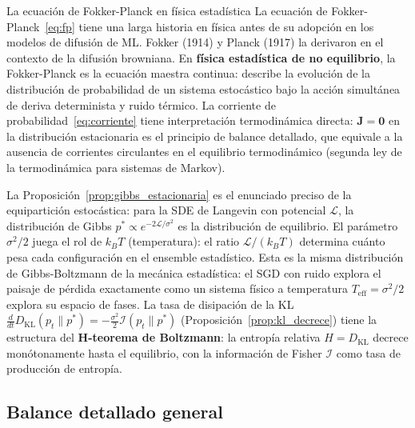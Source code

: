 \begin{fisicaconexion}{La ecuación de Fokker-Planck en física estadística}
La ecuación de Fokker-Planck~\eqref{eq:fp} tiene una larga historia en física
antes de su adopción en los modelos de difusión de ML. Fokker (1914) y Planck
(1917) la derivaron en el contexto de la difusión browniana. En
\textbf{física estadística de no equilibrio}, la Fokker-Planck es la ecuación
maestra continua: describe la evolución de la distribución de probabilidad de
un sistema estocástico bajo la acción simultánea de deriva determinista y ruido
térmico. La corriente de probabilidad~\eqref{eq:corriente} tiene interpretación
termodinámica directa: $\bm{J} = \bm{0}$ en la distribución estacionaria es el
principio de balance detallado, que equivale a la ausencia de corrientes
circulantes en el equilibrio termodinámico (segunda ley de la termodinámica para
sistemas de Markov).

La Proposición~\ref{prop:gibbs_estacionaria} es el enunciado preciso de la
equipartición estocástica: para la SDE de Langevin con potencial $\mathcal{L}$,
la distribución de Gibbs $p^* \propto e^{-2\mathcal{L}/\sigma^2}$ es la
distribución de equilibrio. El parámetro $\sigma^2/2$ juega el rol de $k_BT$
(temperatura): el ratio $\mathcal{L}/(k_BT)$ determina cuánto pesa cada
configuración en el ensemble estadístico. Esta es la misma distribución de
Gibbs-Boltzmann de la mecánica estadística: el SGD con ruido explora el paisaje
de pérdida exactamente como un sistema físico a temperatura $T_{\mathrm{eff}} =
\sigma^2/2$ explora su espacio de fases. La tasa de disipación de la KL
$\frac{d}{dt}D_{\mathrm{KL}}(p_t\|p^*) = -\frac{\sigma^2}{2}\mathcal{I}(p_t\|p^*)$
(Proposición~\ref{prop:kl_decrece}) tiene la estructura del \textbf{H-teorema
de Boltzmann}: la entropía relativa $H = D_{\mathrm{KL}}$ decrece monótonamente
hasta el equilibrio, con la información de Fisher $\mathcal{I}$ como tasa de
producción de entropía.
\end{fisicaconexion}
\label{sec:balance_detallado}

\subsection{Balance detallado general}
\label{subsec:bd_general}

